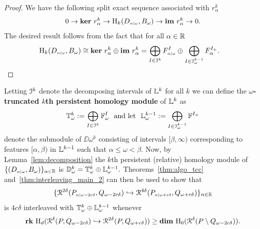 \begin{proof}
  We have the following split exact sequence associated with $r_\alpha^k$
  \[ 0\to \mathbf{ker}~r_\alpha^k\to \mathrm{H}_k(D_{\scriptscriptstyle \alpha\mid \omega}, B_\omega)\to\mathbf{im}~r_\alpha^k\to 0.\]
  The desired result follows from the fact that for all $\alpha\in\mathbb{R}$
  \begin{align*}
    \mathrm{H}_k(D_{\scriptscriptstyle \alpha\mid \omega}, B_\omega) &\cong \mathbf{ker}~r_\alpha^k\oplus \mathbf{im}~r_\alpha^k =\bigoplus_{I\in{\mathcal{I}}^k} F_{\scriptscriptstyle \alpha\mid \omega}^I\oplus \bigoplus_{I\in{\mathcal{I}}_\omega^{k-1}} F_\alpha^{I_+}.
  \end{align*}
\end{proof}

Letting ${\mathcal{I}}^k$ denote the decomposing intervals of $\mathbb{L}^k$ for all $k$ we can define the \textbf{$\omega$-truncated $k$th persistent homology module} of $\mathbb{L}^k$ as
\[ \T_\omega^k := \bigoplus_{I\in\I^k} \FF_\omega^I\ \text{ and let }\ \LL_\omega^{k-1} := \bigoplus_{I\in \I_\omega^{k-1}} \FF^{I_+}\]
denote the submodule of $\DD{\omega}^k$ consisting of intervals $[\beta,\infty)$ corresponding to features $[\alpha,\beta)$ in $\mathbb{L}^{k-1}$ such that $\alpha\leq\omega <\beta$.
Now, by Lemma~\ref{lem:decomposition} the $k$th persistent (relative) homology module of $\{(D_{\scriptscriptstyle \alpha\mid \omega}, B_\omega)\}_{\alpha\in\mathbb{R}}$ is $\mathbb{D}_{\omega}^k = \mathbb{T}_\omega^k\oplus \mathbb{L}_\omega^{k-1}.$
Theorems~\ref{thm:algo_tcc} and~\ref{thm:interleaving_main_2} can then be used to show that
\[ \{\mathcal{R}^{2\delta}(P_{\scriptscriptstyle \alpha\mid \omega-2c\delta}, Q_{\omega-2c\delta})\hookrightarrow \mathcal{R}^{4\delta}(P_{\scriptscriptstyle \alpha\mid \omega+c\delta}, Q_{\omega+c\delta})\}_{\alpha\in\mathbb{R}} \]
is $4c\delta$ interleaved with $\mathbb{T}_\omega^k\oplus \mathbb{L}_\omega^{k-1}$ whenever
\[ \mathbf{rk}~\mathrm{H}_d(\mathcal{R}^\delta(P, Q_{\omega - 2c\delta})\hookrightarrow \mathcal{R}^{2\delta}(P, Q_{\omega+c\delta})) \geq \mathbf{dim}~\mathrm{H}_0(\mathcal{R}^\delta(P\setminus Q_{\omega-2c\delta})).\]


%

